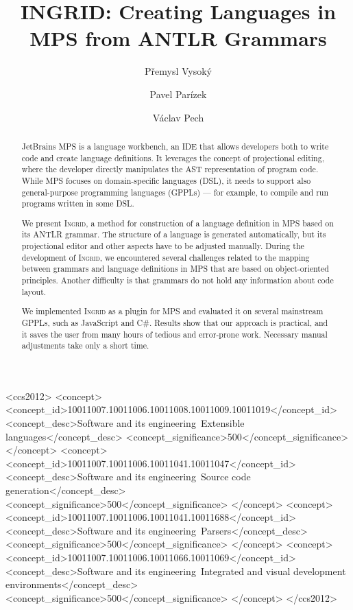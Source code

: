 \documentclass[sigconf]{acmart}
\begin{document}
\title{INGRID: Creating Languages in MPS from ANTLR Grammars}


\author{P\v{r}emysl Vysok\'y}

\author{Pavel Par\'izek}

\author{V\'aclav Pech}



\begin{abstract}
JetBrains MPS is a language workbench, an IDE that allows developers both to write code and create language definitions.
It leverages the concept of projectional editing, where the developer directly manipulates the AST representation of program code.
While MPS focuses on domain-specific languages (DSL), it needs to support also general-purpose programming languages (GPPLs) --- for example, to compile and run programs written in some DSL.

We present \textsc{Ingrid}, a method for construction of a language definition in MPS based on its ANTLR grammar.
The structure of a language is generated automatically, but its projectional editor and other aspects have to be adjusted manually.
During the development of \textsc{Ingrid}, we encountered several challenges related to the mapping between grammars and language definitions in MPS that are based on object-oriented principles.
Another difficulty is that grammars do not hold any information about code layout.

We implemented \textsc{Ingrid} as a plugin for MPS and evaluated it on several mainstream GPPLs, such as JavaScript and C\#.
Results show that our approach is practical, and it saves the user from many hours of tedious and error-prone work.
Necessary manual adjustments take only a short time.
\end{abstract}


\begin{CCSXML}
<ccs2012>
<concept>
<concept_id>10011007.10011006.10011008.10011009.10011019</concept_id>
<concept_desc>Software and its engineering~Extensible languages</concept_desc>
<concept_significance>500</concept_significance>
</concept>
<concept>
<concept_id>10011007.10011006.10011041.10011047</concept_id>
<concept_desc>Software and its engineering~Source code generation</concept_desc>
<concept_significance>500</concept_significance>
</concept>
<concept>
<concept_id>10011007.10011006.10011041.10011688</concept_id>
<concept_desc>Software and its engineering~Parsers</concept_desc>
<concept_significance>500</concept_significance>
</concept>
<concept>
<concept_id>10011007.10011006.10011066.10011069</concept_id>
<concept_desc>Software and its engineering~Integrated and visual development environments</concept_desc>
<concept_significance>500</concept_significance>
</concept>
</ccs2012>
\end{CCSXML}
\end{document}
